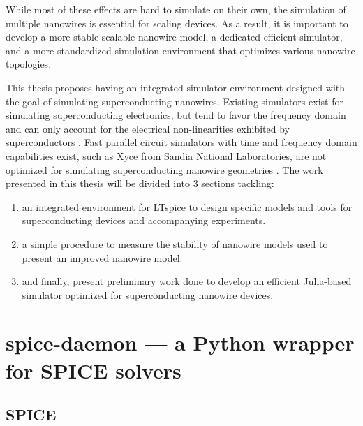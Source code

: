 \documentclass[]{article}
\newcommand{\todoref}[2][]{}
\begin{document}
While most of these effects are hard to simulate on their own, the simulation of multiple nanowires
is essential for scaling devices. As a result, it is important to develop 
a more stable scalable nanowire model, a dedicated efficient simulator, and a more standardized 
simulation environment that optimizes various nanowire topologies.

This thesis proposes having an integrated simulator environment designed with the goal of simulating
superconducting nanowires. Existing simulators exist for simulating
superconducting electronics, but tend to favor the frequency domain and can  
only account for 
the electrical non-linearities exhibited by superconductors \cite{josephsoncircsjl, wrspice}. 
Fast parallel circuit simulators with time and frequency domain capabilities
exist, such as Xyce from Sandia National Laboratories, are not optimized
for simulating superconducting nanowire geometries \cite{xyce_reference}.
The work presented in this thesis will be divided into 3 sections tackling: 
\begin{enumerate}
    \item an integrated environment for LTspice to design specific models and tools for superconducting 
    devices and accompanying experiments.
    \item a simple procedure to measure the stability of nanowire models used to 
    present an improved nanowire model.
    \item and finally, present preliminary work done to develop an efficient Julia-based simulator
    optimized for superconducting nanowire devices.
\end{enumerate}


\todoref[]{WRSpice, JosephsonCircuits.jl}

\todoref[]{Latching: https://studylib.net/doc/11681854/electrothermal-feedback-in-superconducting-nanowire-singl...}

\todoref[]{Check this out: https://ieeexplore.ieee.org/document/4277823/figures#figures}



\section{spice-daemon --- a Python wrapper for SPICE solvers}




\subsection{SPICE}
\end{document}
